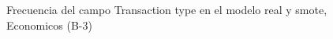 \begin{figure}[H]
    \centering
    
    \caption{Frecuencia del campo Transaction type en el modelo real y smote, Economicos (B-3)}
    \label{frecuency-Transaction Type-smote-enc}
\end{figure}